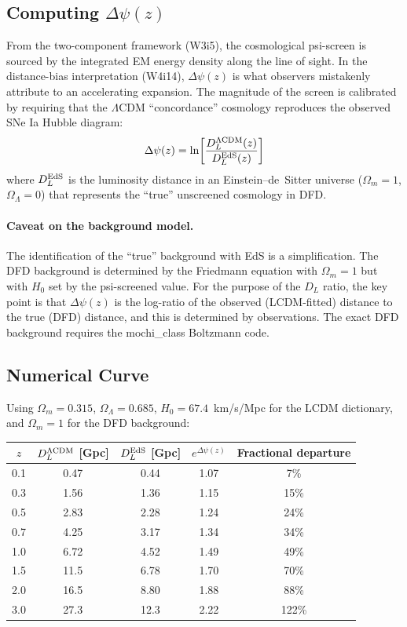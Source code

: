 \documentclass[11pt,a4paper]{article}
\newcommand{\LCDM}{$\Lambda$CDM}
\newcommand{\Dpsi}{\Delta\psi}
\begin{document}
\subsection{Computing $\Dpsi(z)$}

From the two-component framework (W3i5), the cosmological psi-screen
is sourced by the integrated EM energy density along the line of sight.
In the distance-bias interpretation (W4i14), $\Dpsi(z)$ is what
observers mistakenly attribute to an accelerating expansion.  The
magnitude of the screen is calibrated by requiring that the {\LCDM}
``concordance'' cosmology reproduces the observed SNe Ia Hubble diagram:
\begin{equation}
\Dpsi(z) = \ln\!\left[\frac{D_L^{\rm \Lambda CDM}(z)}{D_L^{\rm EdS}(z)}\right]
\end{equation}
where $D_L^{\rm EdS}$ is the luminosity distance in an
Einstein--de~Sitter universe ($\Omega_m = 1$, $\Omega_\Lambda = 0$)
that represents the ``true'' unscreened cosmology in DFD.

\paragraph{Caveat on the background model.}
The identification of the ``true'' background with EdS is a simplification.
The DFD background is determined by the Friedmann equation with
$\Omega_m = 1$ but with $H_0$ set by the psi-screened value.  For
the purpose of the $D_L$ ratio, the key point is that $\Dpsi(z)$
is the log-ratio of the observed (LCDM-fitted) distance to the
true (DFD) distance, and this is determined by observations.  The
exact DFD background requires the mochi\_class Boltzmann code.

\subsection{Numerical Curve}

Using $\Omega_m = 0.315$, $\Omega_\Lambda = 0.685$, $H_0 = 67.4$~km/s/Mpc
for the LCDM dictionary, and $\Omega_m = 1$ for the DFD background:

\begin{center}
\begin{tabular}{ccccc}
\toprule
$z$ & $D_L^{\rm \Lambda CDM}$ [Gpc] & $D_L^{\rm EdS}$ [Gpc] &
  $e^{\Dpsi(z)}$ & Fractional departure \\
\midrule
0.1 & 0.47 & 0.44 & 1.07 & 7\% \\
0.3 & 1.56 & 1.36 & 1.15 & 15\% \\
0.5 & 2.83 & 2.28 & 1.24 & 24\% \\
0.7 & 4.25 & 3.17 & 1.34 & 34\% \\
1.0 & 6.72 & 4.52 & 1.49 & 49\% \\
1.5 & 11.5 & 6.78 & 1.70 & 70\% \\
2.0 & 16.5 & 8.80 & 1.88 & 88\% \\
3.0 & 27.3 & 12.3 & 2.22 & 122\% \\
\bottomrule
\end{tabular}
\end{center}
\end{document}
